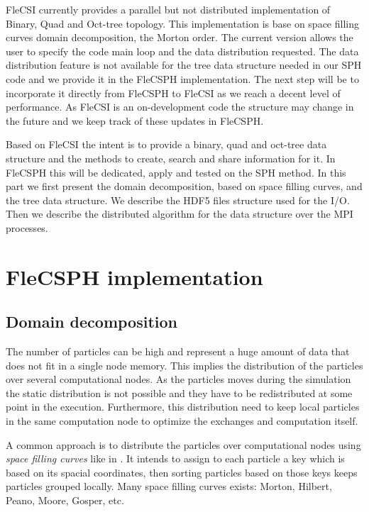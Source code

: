 FleCSI currently provides a parallel but not distributed implementation of Binary, Quad and Oct-tree topology. 
This implementation is base on space filling curves domain decomposition, the Morton order. 
The current version allows the user to specify the code main loop and the data distribution requested. 
The data distribution feature is not available for the tree data structure needed in our SPH code and we provide it in the FleCSPH implementation. 
The next step will be to incorporate it directly from FleCSPH to FleCSI as we reach a decent level of performance.
As FleCSI is an on-development code the structure may change in the future and we keep track of these updates in FleCSPH.


Based on FleCSI the intent is to provide a binary, quad and oct-tree data structure and the methods to create, search and share information for it. 
In FleCSPH this will be dedicated, apply and tested on the SPH method. 
In this part we first present the domain decomposition, based on space filling curves, and the tree data structure.
We describe the HDF5 files structure used for the I/O.
Then we describe the distributed algorithm for the data structure over the MPI processes. 

\section{FleCSPH implementation}

\subsection{Domain decomposition}
\label{sec:domain_decomposition}
The number of particles can be high and represent a huge amount of data that does not fit in a single node memory. 
This implies the distribution of the particles over several computational nodes. 
As the particles moves during the simulation the static distribution is not possible and they have to be redistributed at some point in the execution. 
Furthermore, this distribution need to keep local particles in the same computation node to optimize the exchanges and computation itself.

A common approach is to distribute the particles over computational nodes using \textit{space filling curves} like in \cite{warren20132hot,springel2005cosmological,bedorf201424}. 
It intends to assign to each particle a key which is based on its spacial coordinates, then sorting particles based on those keys keeps particles grouped locally.
Many space filling curves exists: Morton, Hilbert, Peano, Moore, Gosper, etc.\

